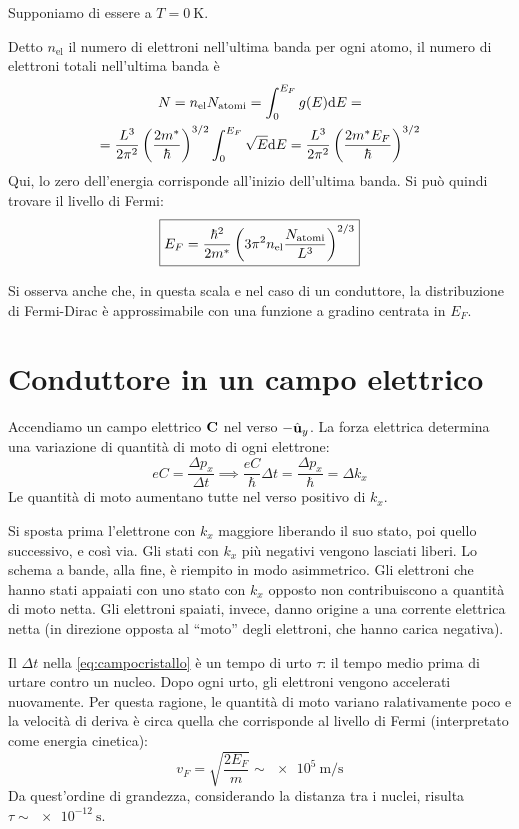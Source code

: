 Supponiamo di essere a $T = \qty{0}{\kelvin}$.

Detto $n_\text{el}$ il numero di elettroni nell'ultima banda per ogni atomo, il numero di elettroni totali nell'ultima banda è
\begin{gather}
    N = n_\text{el} N_\text{atomi} = \int_0^{E_F} g(E) \mathrm{d} E = \\
    = \frac{L^3}{2 \pi^2} \left( \frac{2 m^*}{\hbar} \right)^{3/2} \int_0^{E_F} \sqrt{E} \mathrm{d} E
    = \frac{L^3}{2 \pi^2} \left( \frac{2 m^* E_F}{\hbar} \right)^{3/2}
\end{gather}
Qui, lo zero dell'energia corrisponde all'inizio dell'ultima banda.
Si può quindi trovare il livello di Fermi:
\begin{equation}
    \boxed{
    E_F = \frac{\hbar^2}{2 m^*} \left( 3 \pi^2 n_\text{el} \frac{N_\text{atomi}}{L^3} \right)^{2/3}
    }
\end{equation}


Si osserva anche che, in questa scala e nel caso di un conduttore, la distribuzione di Fermi-Dirac è approssimabile con una funzione a gradino centrata in $E_F$.

\section{Conduttore in un campo elettrico}

Accendiamo un campo elettrico $\mathbf{C}$ nel verso $-\hat{\mathbf{u}}_{y}$.
La forza elettrica determina una variazione di quantità di moto di ogni elettrone:
\begin{equation}
\label{eq:campocristallo}
    e C = \frac{\Delta p_x}{\Delta t}
    \implies
    \frac{e C}{\hbar} \Delta t = \frac{\Delta p_x}{\hbar} = \Delta k_x
\end{equation}
Le quantità di moto aumentano tutte nel verso positivo di $k_x$.

Si sposta prima l'elettrone con $k_x$ maggiore liberando il suo stato, poi quello successivo, e così via.
Gli stati con $k_x$ più negativi vengono lasciati liberi.
Lo schema a bande, alla fine, è riempito in modo asimmetrico.
Gli elettroni che hanno stati appaiati con uno stato con $k_x$ opposto non contribuiscono a quantità di moto netta.
Gli elettroni spaiati, invece, danno origine a una corrente elettrica netta (in direzione opposta al ``moto'' degli elettroni, che hanno carica negativa).

Il $\Delta t$ nella \eqref{eq:campocristallo} è un tempo di urto $\tau$: il tempo medio prima di urtare contro un nucleo.
Dopo ogni urto, gli elettroni vengono accelerati nuovamente.
Per questa ragione, le quantità di moto variano ralativamente poco e la velocità di deriva è circa quella che corrisponde al livello di Fermi (interpretato come energia cinetica):
\begin{equation}
    v_F = \sqrt{\frac{2 E_F}{m}} \sim \qty{e5}{\metre\per\second}
\end{equation}
Da quest'ordine di grandezza, considerando la distanza tra i nuclei, risulta $\tau \sim \qty{e-12}{\second}$.

